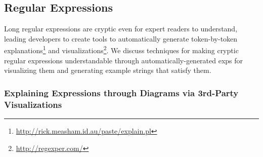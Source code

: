 \begin{figure}
\end{figure}

\subsection{Regular Expressions}

Long regular expressions are cryptic even for expert readers to understand, leading developers to create tools to automatically generate token-by-token explanations\footnote{\url{http://rick.measham.id.au/paste/explain.pl}} and visualizations\footnote{\url{http://regexper.com/}}.
We discuss techniques for making cryptic regular expressions understandable through automatically-generated \glspl{exp} for visualizing them and generating example strings that satisfy them.

\subsubsection{Explaining Expressions through Diagrams via 3rd-Party Visualizations}

